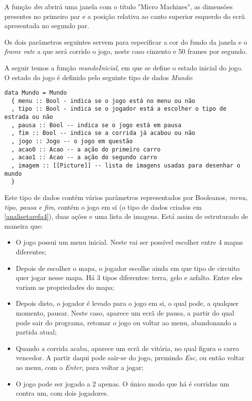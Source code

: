\documentclass[a4paper]{report}
\begin{document}
A função \textit{dm} abrirá uma janela com o título "Micro Machines", as dimensões presentes no primeiro par e a posição relativa ao canto superior esquerdo do ecrã apresentada no segundo par.

Os dois parâmetros seguintes servem para especificar a cor do fundo da janela e o \textit{frame rate} a que será corrido o jogo, neste caso cinzento e 50 frames por segundo.

A seguir temos a função \textit{mundoInicial}, em que se define o estado inicial do jogo. O estado do jogo é definido pelo seguinte tipo de dados \textit{Mundo}:

\begin{verbatim}
data Mundo = Mundo 
  { menu :: Bool - indica se o jogo está no menu ou não
  , tipo :: Bool - indica se o jogador está a escolher o tipo de estrada ou não
  , pausa :: Bool -- indica se o jogo está em pausa
  , fim :: Bool -- indica se a corrida já acabou ou não
  , jogo :: Jogo -- o jogo em questão
  , acao0 :: Acao -- a ação do primeiro carro
  , acao1 :: Acao -- a ação do segundo carro
  , imagem :: [[Picture]] -- lista de imagens usadas para desenhar o mundo
  } 
\end{verbatim}

Este tipo de dados contém vários parâmetros representados por Booleanos, \textit{menu, tipo, pausa e fim}, contém o jogo em si (o tipo de dados criados em \ref{analisetarefa4}), duas ações e uma lista de imagens. Está assim de estruturado de maneira que:

\begin{itemize}
    \item O jogo possui um menu inicial. Neste vai ser possível escolher entre 4 mapas diferentes;
    \item Depois de escolher o mapa, o jogador escolhe ainda em que tipo de circuito quer jogar nesse mapa. Há 3 tipos diferentes: terra, gelo e asfalto. Entre eles variam as propriedades do mapa;
    \item Depois disto, o jogador é levado para o jogo em si, o qual pode, a qualquer momento, pausar. Neste caso, aparece um ecrã de pausa, a partir do qual pode sair do programa, retomar o jogo ou voltar ao menu, abandonando a partida atual;
    \item Quando a corrida acaba, aparece um ecrã de vitória, no qual figura o carro vencedor. A partir daqui pode sair-se do jogo, premindo \textit{Esc}, ou então voltar ao menu, com o \textit{Enter}, para voltar a jogar;
    \item O jogo pode ser jogado a 2 apenas. O único modo que há é corridas um contra um, com dois jogadores.
\end{itemize}
\end{document}
